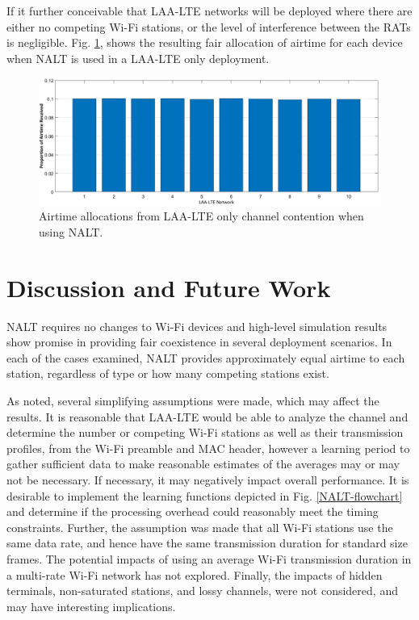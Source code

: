 If it further conceivable that LAA-LTE networks will be deployed where there are either no competing Wi-Fi stations, or the level of interference between the RATs is negligible.  Fig. \ref{NALT-only-results}, shows the resulting fair allocation of airtime for each device when NALT is used in a LAA-LTE only deployment. 
\begin{figure}[H]
	\includegraphics[width=\textwidth]{figures3/LAAonly}
	\caption{Airtime allocations from LAA-LTE only channel contention when using NALT.}
	\label{NALT-only-results}
\end{figure}

\section{Discussion and Future Work}
\label{future-work}
NALT requires no changes to \mbox{Wi-Fi} devices and high-level simulation results show promise in providing fair coexistence in several deployment scenarios.  In each of the cases examined, NALT provides approximately equal airtime to each station, regardless of type or how many competing stations exist.  

As noted, several simplifying assumptions were made, which may affect the results.  It is reasonable that \mbox{LAA-LTE} would be able to analyze the channel and determine the number or competing \mbox{Wi-Fi} stations as well as their transmission profiles, from the \mbox{Wi-Fi} preamble and MAC header, however a learning period to gather sufficient data to make reasonable estimates of the averages may or may not be necessary.  If necessary, it may negatively impact overall performance. It is desirable to implement the learning functions depicted in Fig. \ref{NALT-flowchart} and determine if the processing overhead could reasonably meet the timing constraints. Further, the assumption was made that all \mbox{Wi-Fi} stations use the same data rate, and hence have the same transmission duration for standard size frames.  The potential impacts of using an average \mbox{Wi-Fi} transmission duration in a multi-rate \mbox{Wi-Fi} network has not explored.   Finally, the impacts of hidden terminals, non-saturated stations, and lossy channels, were not considered, and may have interesting implications. 

